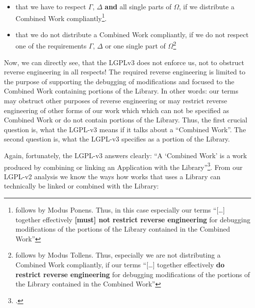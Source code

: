 \begin{itemize}
  \item that we have to respect $\Gamma$, $\Delta$ \textbf{and} all single parts
  of $\Omega$, if we distribute a Combined Work compliantly\footnote{follows by
  Modus Ponens. Thus, in this case especially our terms \enquote{[\ldots]
  together effectively \textbf{[must] not restrict reverse engineering} for
  debugging modifications of the portions of the Library contained in the
  Combined Work}}.
  \item that we do not distribute a Combined Work compliantly, if we do not
  respect one of the requirements $\Gamma$, $\Delta$ or one single part of
  $\Omega$\footnote{follows by Modus Tollens. Thus, especially we are not
  distributing a Combined Work compliantly, if our terms \enquote{[\ldots]
  together effectively \textbf{do restrict reverse engineering} for debugging
  modifications of the portions of the Library contained in the Combined Work}}
\end{itemize}

Now, we can directly see, that the LGPLv3 does not enforce us, not to obstruct
reverse engineering in all respects! The required reverse engineering is limited
to the purpose of supporting the debugging of modifications and focused to the
Combined Work containing portions of the Library. In other words: our terms may
obstruct other purposes of reverse engineering or may restrict reverse
engineering of other forms of our work which which can not be specified as
Combined Work or do not contain portions of the Library. Thus, the first crucial
question is, what the LGPL-v3 means if it talks about a \enquote{Combined Work}.
The second question is, what the LGPL-v3 specifies as a portion of the Library.

Again, fortunately, the LGPL-v3 answers clearly: \enquote{A \enquote{Combined
Work} is a work produced by combining or linking an Application with the
Library}\footcite[cf.][\nopage wp., §0]{Lgpl30OsiLicense2007a}. From our LGPL-v2
analysis we know the ways how works that uses a Library can technically be
linked or combined with the Library:

